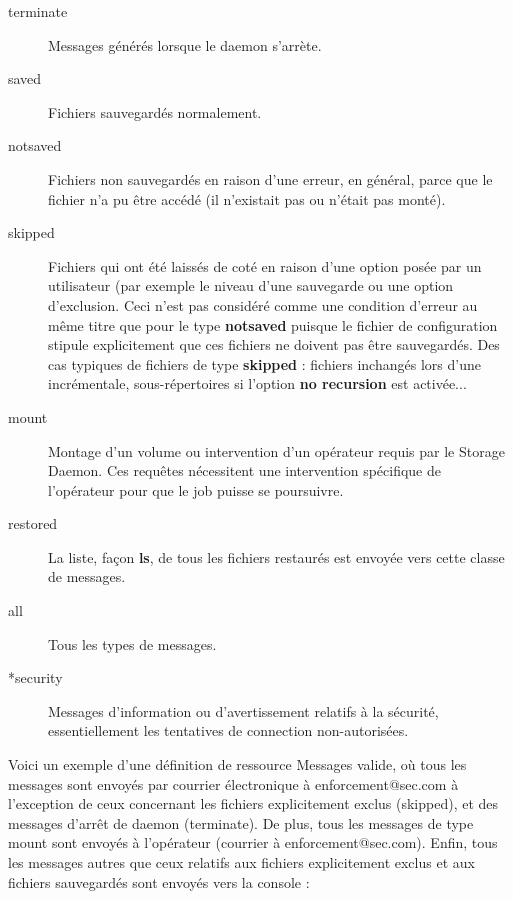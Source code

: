 \begin{description}
\begin{description}
\item [terminate]
   Messages g\'en\'er\'es lorsque le daemon s'arr\`ete.

\item [saved]
   Fichiers sauvegard\'es normalement.

\item [notsaved]
   Fichiers non sauvegard\'es en raison d'une erreur, en g\'en\'eral, parce que le 
   fichier n'a pu \^etre acc\'ed\'e (il n'existait pas ou n'\'etait pas mont\'e).

\item [skipped]
   Fichiers qui ont \'et\'e laiss\'es de cot\'e en raison d'une option pos\'ee par un 
   utilisateur (par exemple le niveau d'une sauvegarde ou une option 
   d'exclusion. Ceci n'est pas consid\'er\'e comme une condition d'erreur au m\^eme 
   titre que pour le type {\bf notsaved} puisque le fichier de configuration 
   stipule explicitement que ces fichiers ne doivent pas \^etre sauvegard\'es. 
   Des cas typiques de fichiers de type {\bf skipped} : fichiers inchang\'es 
   lors d'une incr\'ementale, sous-r\'epertoires si l'option {\bf no recursion} 
   est activ\'ee...

\item [mount]
   Montage d'un volume ou intervention d'un op\'erateur requis par le Storage Daemon. 
   Ces requ\^etes n\'ecessitent une intervention sp\'ecifique de l'op\'erateur pour que le 
   job puisse se poursuivre. 

\item [restored]
   La liste, fa\c{c}on {\bf ls}, de tous les fichiers restaur\'es est envoy\'ee vers 
   cette classe de messages.
   
\item [all]
   Tous les types de messages.

\item [*security]
   Messages d'information ou d'avertissement relatifs \`a la s\'ecurit\'e, 
   essentiellement les tentatives de connection non-autoris\'ees.
\end{description}

\end{description}

Voici un exemple d'une d\'efinition de ressource Messages valide, o\`u tous les 
messages sont envoy\'es par courrier \'electronique \`a  enforcement@sec.com \`a 
l'exception de ceux concernant les fichiers explicitement exclus (skipped), 
et des messages d'arr\^et de daemon (terminate). De plus, tous les messages 
de type mount sont envoy\'es \`a l'op\'erateur (courrier \`a enforcement@sec.com). 
Enfin, tous les messages autres que ceux relatifs aux fichiers explicitement 
exclus et aux fichiers sauvegard\'es sont envoy\'es vers la console :

